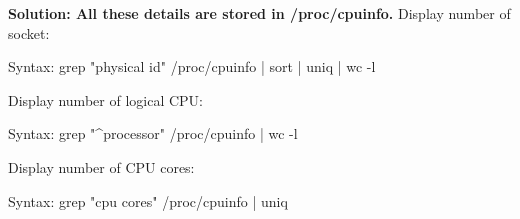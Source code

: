 \begin{flushleft}
\textbf{Solution: All these details are stored in /proc/cpuinfo.}
\newline
\bigskip
Display number of socket:
\begin{tcolorbox}[breakable,notitle,boxrule=-0pt,colback=pink,colframe=pink]
	\color{black}
	\font=9pt
	Syntax: grep "physical id" /proc/cpuinfo | sort | uniq | wc -l
	\font=4pt
\end{tcolorbox}
\bigskip
Display number of logical CPU:
\begin{tcolorbox}[breakable,notitle,boxrule=-0pt,colback=pink,colframe=pink]
	\color{black}
	\font=9pt
	Syntax: grep "\^{}processor" /proc/cpuinfo | wc -l
	\font=4pt
\end{tcolorbox}
\bigskip
Display number of CPU cores:
\begin{tcolorbox}[breakable,notitle,boxrule=-0pt,colback=pink,colframe=pink]
	\color{black}
	\font=9pt
	Syntax: grep "cpu cores" /proc/cpuinfo | uniq
	\font=4pt
\end{tcolorbox}



\end{flushleft}

\newpage


